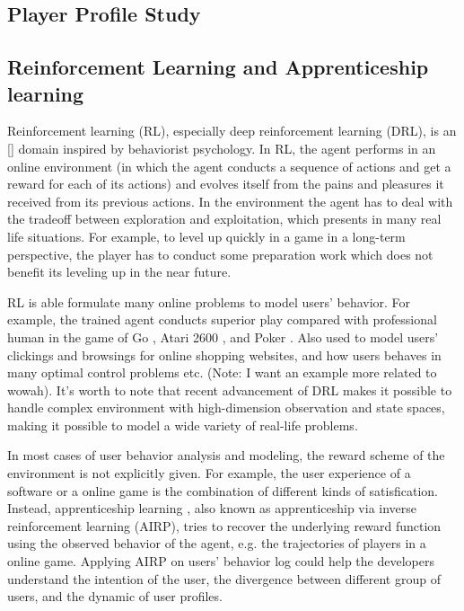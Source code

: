 \documentclass{sigchi}
\begin{document}
\subsection{Player Profile Study}



\subsection{Reinforcement Learning and Apprenticeship learning}

Reinforcement learning (RL), especially deep reinforcement learning (DRL), is an [] domain  inspired by behaviorist psychology. In RL, the agent performs in an online environment (in which the agent conducts a sequence of actions and get a reward for each of its actions) and evolves itself from the pains and pleasures it received from its previous actions. In the environment the agent has to deal with the tradeoff between exploration and exploitation, which presents in many real life situations. For example, to level up quickly in a game in a long-term perspective, the player has to conduct some preparation work which does not benefit its leveling up in the near future.

RL is able formulate many online problems to model users' behavior. For example, the trained agent conducts superior play compared with professional human in the game of Go \cite{silver2016mastering}, Atari 2600 \cite{mnih2015human}, and Poker \cite{heinrich2016deep}. Also used to model users' clickings and browsings for online shopping websites, and how users behaves in many optimal control problems etc. (Note: I want an example more related to wowah). It's worth to note that recent advancement of DRL makes it possible to handle complex environment with high-dimension observation and state spaces, making it possible to model a wide variety of real-life problems.

In most cases of user behavior analysis and modeling, the reward scheme of the environment is not explicitly given. For example, the user experience of a software or a online game is the combination of different kinds of satisfication. Instead, apprenticeship learning \cite{ratliff2006maximum,abbeel2004apprenticeship,ng2000algorithms}, also known as apprenticeship via inverse reinforcement learning (AIRP), tries to recover the underlying reward function using the observed behavior of the agent, e.g. the trajectories of players in a online game. Applying AIRP on users' behavior log could help the developers understand the intention of the user, the divergence between different group of users, and the dynamic of user profiles. 
\end{document}
